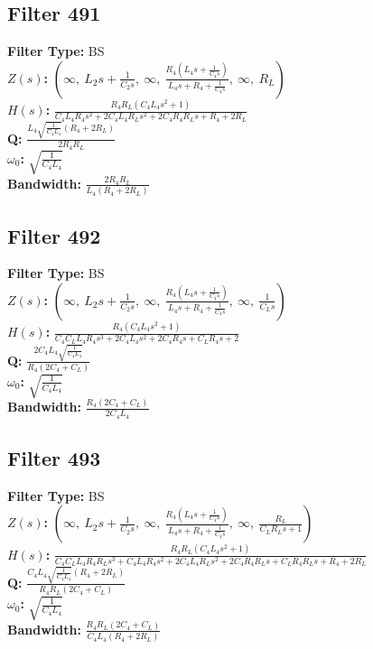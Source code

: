 \documentclass{article}
\begin{document}
\subsection*{Filter 491}
\textbf{Filter Type:} BS \\ 
\textbf{$Z(s)$:} $\left( \infty, \  L_{2} s + \frac{1}{C_{2} s}, \  \infty, \  \frac{R_{4} \left(L_{4} s + \frac{1}{C_{4} s}\right)}{L_{4} s + R_{4} + \frac{1}{C_{4} s}}, \  \infty, \  R_{L}\right)$ \\ 
\textbf{$H(s)$:} $\frac{R_{4} R_{L} \left(C_{4} L_{4} s^{2} + 1\right)}{C_{4} L_{4} R_{4} s^{2} + 2 C_{4} L_{4} R_{L} s^{2} + 2 C_{4} R_{4} R_{L} s + R_{4} + 2 R_{L}}$ \\ 
\textbf{Q:} $\frac{L_{4} \sqrt{\frac{1}{C_{4} L_{4}}} \left(R_{4} + 2 R_{L}\right)}{2 R_{4} R_{L}}$ \\ 
\textbf{$\omega_0$:} $\sqrt{\frac{1}{C_{4} L_{4}}}$ \\ 
\textbf{Bandwidth:} $\frac{2 R_{4} R_{L}}{L_{4} \left(R_{4} + 2 R_{L}\right)}$ \\ 
\subsection*{Filter 492}
\textbf{Filter Type:} BS \\ 
\textbf{$Z(s)$:} $\left( \infty, \  L_{2} s + \frac{1}{C_{2} s}, \  \infty, \  \frac{R_{4} \left(L_{4} s + \frac{1}{C_{4} s}\right)}{L_{4} s + R_{4} + \frac{1}{C_{4} s}}, \  \infty, \  \frac{1}{C_{L} s}\right)$ \\ 
\textbf{$H(s)$:} $\frac{R_{4} \left(C_{4} L_{4} s^{2} + 1\right)}{C_{4} C_{L} L_{4} R_{4} s^{3} + 2 C_{4} L_{4} s^{2} + 2 C_{4} R_{4} s + C_{L} R_{4} s + 2}$ \\ 
\textbf{Q:} $\frac{2 C_{4} L_{4} \sqrt{\frac{1}{C_{4} L_{4}}}}{R_{4} \left(2 C_{4} + C_{L}\right)}$ \\ 
\textbf{$\omega_0$:} $\sqrt{\frac{1}{C_{4} L_{4}}}$ \\ 
\textbf{Bandwidth:} $\frac{R_{4} \left(2 C_{4} + C_{L}\right)}{2 C_{4} L_{4}}$ \\ 
\subsection*{Filter 493}
\textbf{Filter Type:} BS \\ 
\textbf{$Z(s)$:} $\left( \infty, \  L_{2} s + \frac{1}{C_{2} s}, \  \infty, \  \frac{R_{4} \left(L_{4} s + \frac{1}{C_{4} s}\right)}{L_{4} s + R_{4} + \frac{1}{C_{4} s}}, \  \infty, \  \frac{R_{L}}{C_{L} R_{L} s + 1}\right)$ \\ 
\textbf{$H(s)$:} $\frac{R_{4} R_{L} \left(C_{4} L_{4} s^{2} + 1\right)}{C_{4} C_{L} L_{4} R_{4} R_{L} s^{3} + C_{4} L_{4} R_{4} s^{2} + 2 C_{4} L_{4} R_{L} s^{2} + 2 C_{4} R_{4} R_{L} s + C_{L} R_{4} R_{L} s + R_{4} + 2 R_{L}}$ \\ 
\textbf{Q:} $\frac{C_{4} L_{4} \sqrt{\frac{1}{C_{4} L_{4}}} \left(R_{4} + 2 R_{L}\right)}{R_{4} R_{L} \left(2 C_{4} + C_{L}\right)}$ \\ 
\textbf{$\omega_0$:} $\sqrt{\frac{1}{C_{4} L_{4}}}$ \\ 
\textbf{Bandwidth:} $\frac{R_{4} R_{L} \left(2 C_{4} + C_{L}\right)}{C_{4} L_{4} \left(R_{4} + 2 R_{L}\right)}$ \\ 
\end{document}
